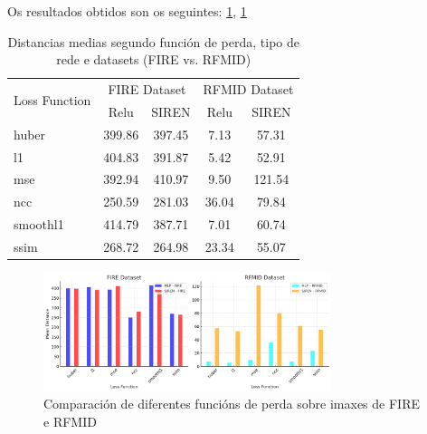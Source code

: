 Os resultados obtidos son os seguintes: \ref{tab:mean_distances}, \ref{fig:loss_functions_comparison}



\begin{table}[h]
    \centering
    \begin{tabular}{|l|cc|cc|}
    \hline
    \multirow{2}{*}{Loss Function} & \multicolumn{2}{c|}{FIRE Dataset} & \multicolumn{2}{c|}{RFMID Dataset} \\ \cline{2-5}
     & Relu & SIREN & Relu & SIREN \\ \hline
    huber & 399.86 & 397.45 & 7.13 & 57.31 \\ \hline
    l1 & 404.83 & 391.87 & 5.42 & 52.91 \\ \hline
    mse & 392.94 & 410.97 & 9.50 & 121.54 \\ \hline
    ncc & 250.59 & 281.03 & 36.04 & 79.84 \\ \hline
    smoothl1 & 414.79 & 387.71 & 7.01 & 60.74 \\ \hline
    ssim & 268.72 & 264.98 & 23.34 & 55.07 \\ \hline
    \end{tabular}
    \caption{Distancias medias segundo función de perda, tipo de rede e datasets (FIRE vs. RFMID)}
    \label{tab:mean_distances}
\end{table}

\begin{figure}[h]
    \centering
    \includegraphics[width=0.75\textwidth]{imaxes/losstype.png}
    \caption{Comparación de diferentes funcións de perda sobre imaxes de FIRE e RFMID}
    \label{fig:loss_functions_comparison}
\end{figure}
    


